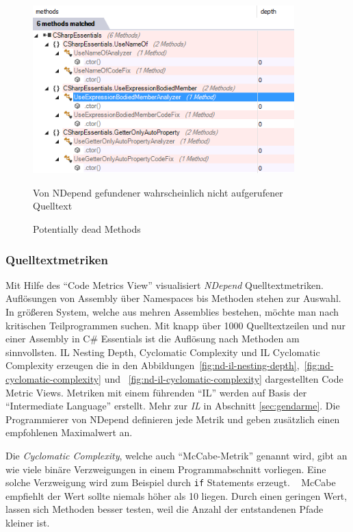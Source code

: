 \begin{figure}[!ht]
\centering
\includegraphics[width=0.9\textwidth]{images/dead-methods.png}
\caption{Potentially dead Methods}
\vspace{0.1cm}
Von NDepend gefundener wahrscheinlich nicht aufgerufener Quelltext
\label{fig:dead-methods}
\end{figure}

\subsubsection{Quelltextmetriken}
\label{sec:nd-code-metrics}
Mit Hilfe des \enquote{Code Metrics View} visualisiert \emph{NDepend} Quelltextmetriken. Auflösungen von Assembly über Namespaces bis Methoden stehen zur Auswahl. In größeren System, welche aus mehren Assemblies bestehen, möchte man nach kritischen Teilprogrammen suchen. Mit knapp über 1000 Quelltextzeilen und nur einer Assembly in C\# Essentials ist die Auflösung nach Methoden am sinnvollsten. IL Nesting Depth, Cyclomatic Complexity und IL Cyclomatic Complexity erzeugen die in den Abbildungen~\ref{fig:nd-il-nesting-depth},~\ref{fig:nd-cyclomatic-complexity} und ~\ref{fig:nd-il-cyclomatic-complexity} dargestellten Code Metric Views. Metriken mit einem führenden \enquote{IL} werden auf Basis der \enquote{Intermediate Language} erstellt. Mehr zur \emph{IL} in Abschnitt \ref{sec:gendarme}. Die Programmierer von NDepend definieren jede Metrik und geben zusätzlich einen empfohlenen Maximalwert an.~\cite{ndepend-metrics}

Die \emph{Cyclomatic Complexity}, welche auch \enquote{McCabe-Metrik} genannt wird, gibt an wie viele binäre Verzweigungen in einem Programmabschnitt vorliegen. Eine solche Verzweigung wird zum Beispiel durch \texttt{if} Statements erzeugt. ~\cite{mccabe} McCabe empfiehlt der Wert sollte niemals höher als 10 liegen. Durch einen geringen Wert, lassen sich Methoden besser testen, weil die Anzahl der entstandenen Pfade kleiner ist.

